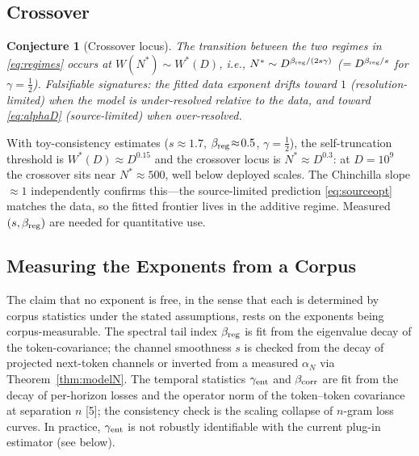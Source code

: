 \documentclass[entropy,article,submit,moreauthors,pdftex]{Definitions/mdpi}
\newtheorem{conjecture}{Conjecture}
\begin{document}
\subsection{Crossover}
\begin{conjecture}[Crossover locus]
\label{conj:crossover}
The transition between the two regimes in \eqref{eq:regimes} occurs at
$W(N^*)\sim W^*(D)$, i.e., $N^*\sim D^{\beta_{\rm reg}/(2s\gamma)}$
($=D^{\beta_{\rm reg}/s}$ for $\gamma=\frac12$). Falsifiable signatures: the
fitted data exponent drifts toward $1$ (resolution-limited) when the model is
under-resolved relative to the data, and toward \eqref{eq:alphaD}
(source-limited) when over-resolved.
\end{conjecture}

With toy-consistency estimates ($s\!\approx\!1.7$,
$\beta_{\rm reg}\!\approx\!0.5$, $\gamma\!=\!\tfrac12$), the self-truncation
threshold is $W^*(D)\!\approx\!D^{0.15}$ and the crossover locus is
$N^*\!\approx\!D^{0.3}$: at $D=10^9$ the crossover sits near $N^*\!\approx\!500$,
well below deployed scales.  The Chinchilla slope $\approx\!1$ independently
confirms this---the source-limited prediction \eqref{eq:sourceopt} matches the
data, so the fitted frontier lives in the additive regime.  Measured
$(s,\beta_{\rm reg})$ are needed for quantitative use.

\subsection{Measuring the Exponents from a Corpus}
\label{sec:measurement}

The claim that no exponent is free, in the sense that each is determined by
corpus statistics under the stated assumptions, rests on the exponents being
corpus-measurable. The spectral tail index $\beta_{\rm reg}$ is fit from the
eigenvalue decay of the token-covariance; the channel smoothness $s$ is checked
from the decay of projected next-token channels or inverted from a measured
$\alpha_N$ via Theorem~\ref{thm:modelN}. The temporal statistics $\gamma_{\rm ent}$
and $\beta_{\rm corr}$ are fit from the decay of per-horizon losses and the
operator norm of the token--token covariance at separation $n$
[5]; the consistency check is the scaling collapse of
$n$-gram loss curves. In practice, $\gamma_{\rm ent}$ is not robustly
identifiable with the current plug-in estimator (see below).
\end{document}
